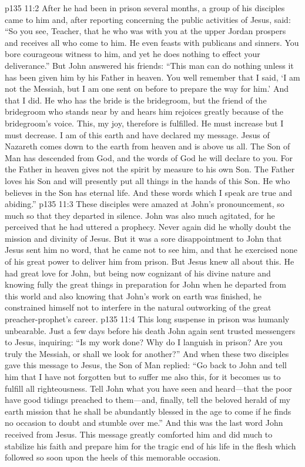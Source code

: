 \pc \vs p135 11:2 After he had been in prison several months, a group of his disciples came to him and, after reporting concerning the public activities of Jesus, said: “So you see, Teacher, that he who was with you at the upper Jordan prospers and receives all who come to him. He even feasts with publicans and sinners. You bore courageous witness to him, and yet he does nothing to effect your deliverance.” But John answered his friends: “This man can do nothing unless it has been given him by his Father in heaven. You well remember that I said, ‘I am not the Messiah, but I am one sent on before to prepare the way for him.’ And that I did. He who has the bride is the bridegroom, but the friend of the bridegroom who stands near by and hears him rejoices greatly because of the bridegroom’s voice. This, my joy, therefore is fulfilled. He must increase but I must decrease. I am of this earth and have declared my message. Jesus of Nazareth comes down to the earth from heaven and is above us all. The Son of Man has descended from God, and the words of God he will declare to you. For the Father in heaven gives not the spirit by measure to his own Son. The Father loves his Son and will presently put all things in the hands of this Son. He who believes in the Son has eternal life. And these words which I speak are true and abiding.”
\pc \vs p135 11:3 These disciples were amazed at John’s pronouncement, so much so that they departed in silence. John was also much agitated, for he perceived that he had uttered a prophecy. Never again did he wholly doubt the mission and divinity of Jesus. But it was a sore disappointment to John that Jesus sent him no word, that he came not to see him, and that he exercised none of his great power to deliver him from prison. But Jesus knew all about this. He had great love for John, but being now cognizant of his divine nature and knowing fully the great things in preparation for John when he departed from this world and also knowing that John’s work on earth was finished, he constrained himself not to interfere in the natural outworking of the great preacher\hyp{}prophet’s career.\plusone
\pc \vs p135 11:4 This long suspense in prison was humanly unbearable. Just a few days before his death John again sent trusted messengers to Jesus, inquiring: “Is my work done? Why do I languish in prison? Are you truly the Messiah, or shall we look for another?” And when these two disciples gave this message to Jesus, the Son of Man replied: \textcolor{ubdarkred}{“Go back to John and tell him that I have not forgotten but to suffer me also this, for it becomes us to fulfill all righteousness. Tell John what you have seen and heard---that the poor have good tidings preached to them---and, finally, tell the beloved herald of my earth mission that he shall be abundantly blessed in the age to come if he finds no occasion to doubt and stumble over me.”} And this was the last word John received from Jesus. This message greatly comforted him and did much to stabilize his faith and prepare him for the tragic end of his life in the flesh which followed so soon upon the heels of this memorable occasion.
